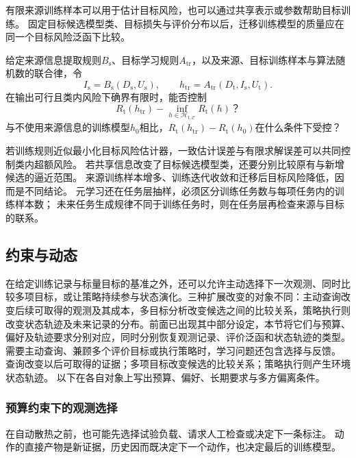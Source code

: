 有限来源训练样本可以用于估计目标风险，也可以通过共享表示或参数帮助目标训练。
固定目标候选模型类、目标损失与评价分布以后，迁移训练模型的质量应在同一个目标风险泛函下比较。

\begin{mathproblem}[迁移训练模型与目标最佳候选的风险差]
  \label{question:future-transfer-excess-risk}
  给定来源信息提取规则$B_{\mathrm s}$、目标学习规则$A_{\mathrm{tr}}$，以及来源、目标训练样本与算法随机数的联合律，令
  \[
    I_{\mathrm s}=B_{\mathrm s}(D_{\mathrm s},U_{\mathrm s}),\qquad
    h_{\mathrm{tr}}=A_{\mathrm{tr}}(D_{\mathrm t},I_{\mathrm s},U_{\mathrm t}).
  \]
  在输出可行且类内风险下确界有限时，能否控制
  \[
    R_{\mathrm t}(h_{\mathrm{tr}})-\inf_{h\in\mathcal H_{\mathrm t,\mathcal C}}R_{\mathrm t}(h)\text{？}
  \]
  与不使用来源信息的训练模型$h_0$相比，$R_{\mathrm t}(h_{\mathrm{tr}})-R_{\mathrm t}(h_0)$在什么条件下受控？
\end{mathproblem}

若训练规则近似最小化目标风险估计器，一致估计误差与有限求解误差可以共同控制类内超额风险。
若共享信息改变了目标候选模型类，还要分别比较原有与新增候选的逼近范围。
来源训练样本增多、训练迭代收敛和迁移后目标风险降低，因而是不同结论。
元学习还在任务层抽样，必须区分训练任务数与每项任务内的训练样本数；
未来任务生成规律不同于训练任务时，则在任务层再检查来源与目标的联系。

\subsection{约束与动态}
\label{sec:future-feedback-theory-map}

在给定训练记录与标量目标的基准之外，还可以允许主动选择下一次观测、同时比较多项目标，或让策略持续参与状态演化。三种扩展改变的对象不同：主动查询改变后续可取得的观测及其成本，多目标分析改变候选之间的比较关系，策略执行则改变状态轨迹及未来记录的分布。前面已出现其中部分设定，本节将它们与预算、偏好及轨迹要求分别对应，同时分别恢复观测记录、评价泛函和状态轨迹的类型。
需要主动查询、兼顾多个评价目标或执行策略时，学习问题还包含选择与反馈。
查询改变以后可取得的证据；多项目标改变候选的比较关系；策略执行则产生环境状态轨迹。
以下在各自对象上写出预算、偏好、长期要求与多方偏离条件。

\subsubsection{预算约束下的观测选择}
\label{sec:future-analysis-information-acquisition}

在自动散热之前，也可能先选择试验负载、请求人工检查或决定下一条标注。
动作的直接产物是新证据，历史因而既决定下一个动作，也决定最后的训练模型。

